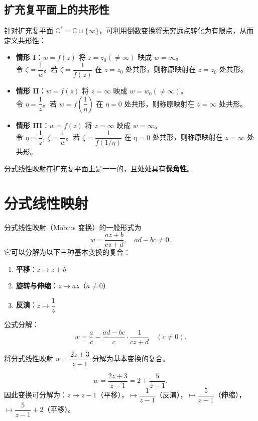 \subsection{扩充复平面上的共形性}
针对扩充复平面 \(\mathbb{C}^* = \mathbb{C}\cup\{\infty\}\)，可利用倒数变换将无穷远点转化为有限点，从而定义共形性：
\begin{itemize}
  \item \textbf{情形 I}：\(w = f(z)\) 将 \(z = z_0 (\neq \infty)\) 映成 \(w = \infty\)。\\
  令 \(\zeta = \dfrac{1}{w}\)。若 \(\zeta = \dfrac{1}{f(z)}\) 在 \(z = z_0\) 处共形，则称原映射在 \(z = z_0\) 处共形。
  \item \textbf{情形 II}：\(w = f(z)\) 将 \(z = \infty\) 映成 \(w = w_0 (\neq \infty)\)。\\
  令 \(\eta = \dfrac{1}{z}\)。若 \(w = f\!\left(\dfrac{1}{\eta}\right)\) 在 \(\eta = 0\) 处共形，则称原映射在 \(z = \infty\) 处共形。
  \item \textbf{情形 III}：\(w = f(z)\) 将 \(z = \infty\) 映成 \(w = \infty\)。\\
  令 \(\eta = \dfrac{1}{z},\ \zeta = \dfrac{1}{w}\)。若 \(\zeta = \dfrac{1}{f(1/\eta)}\) 在 \(\eta = 0\) 处共形，则称原映射在 \(z = \infty\) 处共形。
\end{itemize}

\begin{theorem}[分式线性映射的保角性]
  分式线性映射在扩充复平面上是一一的，且处处具有\textbf{保角性}。
\end{theorem}

\section{分式线性映射}
分式线性映射（Möbius 变换）的一般形式为
\[
w = \frac{az+b}{cz+d}, \quad ad - bc \neq 0.
\]
它可以分解为以下三种基本变换的复合：
\begin{enumerate}
  \item \textbf{平移}：\(z \mapsto z + b\)
  \item \textbf{旋转与伸缩}：\(z \mapsto az\)（\(a \neq 0\)）
  \item \textbf{反演}：\(z \mapsto \dfrac{1}{z}\)
\end{enumerate}
公式分解：
\[
w = \frac{a}{c} - \frac{ad-bc}{c} \cdot \frac{1}{cz+d} \quad (c \neq 0).
\]

\begin{example}
  将分式线性映射 \(w = \dfrac{2z+3}{z-1}\) 分解为基本变换的复合。
\end{example}
\begin{solution}
  \[
  w = \frac{2z+3}{z-1} = 2 + \frac{5}{z-1}.
  \]
  因此变换可分解为：\(z \mapsto z-1\)（平移），\(\mapsto \dfrac{1}{z-1}\)（反演），\(\mapsto \dfrac{5}{z-1}\)（伸缩），\(\mapsto \dfrac{5}{z-1}+2\)（平移）。
\end{solution}

